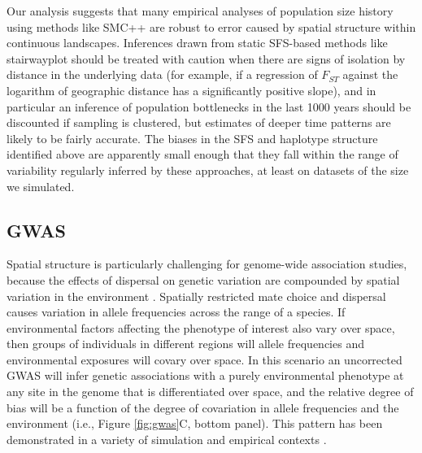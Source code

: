 \documentclass[10pt,twoside,lineno,hidelinks]{preprint}
\begin{document}
Our analysis suggests that many empirical analyses of population size history using methods like SMC++ are robust to error caused by spatial structure within continuous landscapes. Inferences drawn from static SFS-based methods like stairwayplot should be treated with caution when there are signs of isolation by distance in the underlying data (for example, if a regression of $F_{ST}$ against the logarithm of geographic distance has a significantly positive slope), and in particular an inference of population bottlenecks in the last 1000 years should be discounted if sampling is clustered, but estimates of deeper time patterns are likely to be fairly accurate. The biases in the SFS and haplotype structure identified above \citep[see also][]{Wakeley1999,Chikhi2010,Stadler2009} are apparently small enough that they fall within the range of variability regularly inferred by these approaches, at least on datasets of the size we simulated. 

\subsection{GWAS}

Spatial structure is particularly challenging for genome-wide association studies, because the effects of dispersal on genetic variation are compounded by spatial variation in the environment \citep{Mathieson2012}. Spatially restricted mate choice and dispersal causes variation in allele frequencies across the range of a species. If environmental factors affecting the phenotype of interest also vary over space, then groups of individuals in different regions will allele frequencies and environmental exposures will covary over space. In this scenario an uncorrected GWAS will infer genetic associations with a purely environmental phenotype at any site in the genome that is differentiated over space, and the relative degree of bias will be a function of the degree of covariation in allele frequencies and the environment (i.e., Figure \ref{fig:gwas}C, bottom panel). This pattern has been demonstrated in a variety of simulation and empirical contexts \citep{Price2006,Yu2006,Young2018,Mathieson2012,Kang2008,Kang2010,Bulik-Sullivan2015,Berg2018,Sohail2018}. 
\end{document}
